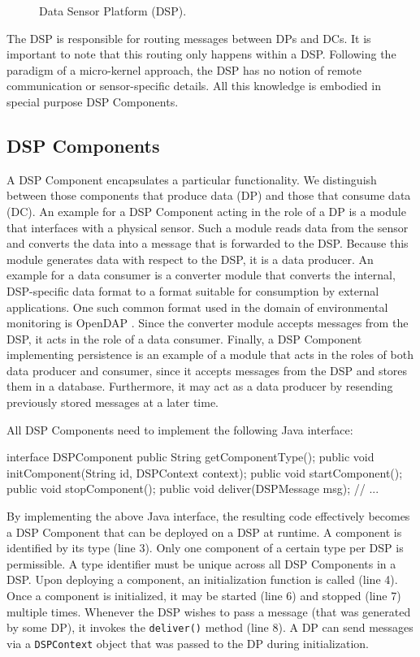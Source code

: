 \documentclass[conference]{IEEEtran}
\begin{document}
\begin{figure}
\centering
{}
\caption{\label{FIG_DSP} Data Sensor Platform (DSP).}
\end{figure}

The DSP is responsible for routing messages between DPs and DCs. It is
important to note that this routing only happens within a
DSP. Following the paradigm of a micro-kernel approach, the DSP has no
notion of remote communication or sensor-specific details. All this
knowledge is embodied in special purpose DSP Components.

\subsection{DSP Components}

A DSP Component encapsulates a particular functionality. We
distinguish between those components that produce data (DP) and those
that consume data (DC). An example for a DSP Component acting in the
role of a DP is a module that interfaces with a physical sensor. Such
a module reads data from the sensor and converts the data into a
message that is forwarded to the DSP. Because this module generates
data with respect to the DSP, it is a data producer. An example for a
data consumer is a converter module that converts the internal,
DSP-specific data format to a format suitable for consumption by
external applications. One such common format used in the domain of
environmental monitoring is OpenDAP \cite{opendap01}.  Since the
converter module accepts messages from the DSP, it acts in the role of
a data consumer. Finally, a DSP Component implementing persistence is
an example of a module that acts in the roles of both data producer
and consumer, since it accepts messages from the DSP and stores them in a
database. Furthermore, it may act as a data producer by resending previously
stored messages at a later time.

All DSP Components need to implement the following Java interface:

\begin{code}
interface DSPComponent
{
   public String getComponentType();
   public void initComponent(String     id, 
                             DSPContext context);
   public void startComponent();
   public void stopComponent();
   public void deliver(DSPMessage msg);
   // ...
}
\end{code}

By implementing the above Java interface, the resulting code
effectively becomes a DSP Component that can be deployed on a DSP at
runtime. A component is identified by its type (line 3). Only one
component of a certain type per DSP is permissible. A type identifier
must be unique across all DSP Components in a DSP. Upon deploying a
component, an initialization function is called (line 4). Once a
component is initialized, it may be started (line 6) and stopped (line
7) multiple times. Whenever the DSP wishes to pass a message (that was
generated by some DP), it invokes the \texttt{deliver()} method (line
8). A DP can send messages via a \texttt{DSPContext} object that was
passed to the DP during initialization.
\end{document}
